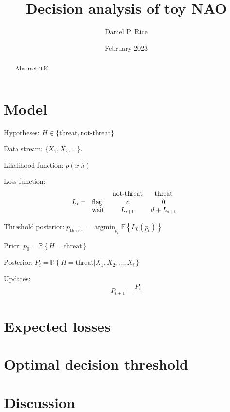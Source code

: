 \documentclass[12pt, letterpaper]{article}
\title{Decision analysis of toy NAO}
\author{Daniel P. Rice}
\date{February 2023}
\DeclareMathOperator*{\argmin}{argmin}
\begin{document}
\maketitle

\begin{abstract}
    Abstract TK
\end{abstract}

\tableofcontents

\section{Model}

Hypotheses: $H \in \{\text{threat}, \text{not-threat}\}$

Data stream: $\{X_1, X_2, \ldots\}$.

Likelihood function: $p(x | h)$

Loss function:
\begin{equation}
    L_i =
    \begin{tabular}{l c c}
        & not-threat & threat \\
        flag & $c$ & $0$ \\
        wait & $L_{i+1}$ & $d + L_{i+1}$
    \end{tabular}
\end{equation}

Threshold posterior: $p_{\text{thresh}} = \argmin_{p_t} \mathbb{E}\left\{L_0(p_t)\right\}$

Prior: $p_0 = \mathbb{P}\left\{H=\text{threat}\right\}$

Posterior: $P_i = \mathbb{P}\left\{H=\text{threat} | X_1, X_2, \ldots, X_i\right\}$

Updates:
\begin{equation}
    P_{i+1} = \frac{P_i}{}
\end{equation}

\section{Expected losses}

\section{Optimal decision threshold}

\section{Discussion}
\end{document}
